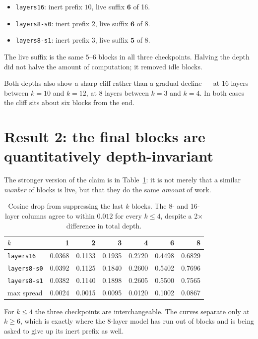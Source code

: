 \documentclass[11pt]{article}
\newcommand{\code}[1]{\texttt{\small #1}}
\begin{document}
\begin{itemize}
  \item \code{layers16}: inert prefix $10$, live suffix $\mathbf{6}$ of 16.
  \item \code{layers8-s0}: inert prefix $2$, live suffix $\mathbf{6}$ of 8.
  \item \code{layers8-s1}: inert prefix $3$, live suffix $\mathbf{5}$ of 8.
\end{itemize}

The live suffix is the same $5$--$6$ blocks in all three checkpoints. Halving
the depth did not halve the amount of computation; it removed idle blocks.

Both depths also show a sharp cliff rather than a gradual decline --- at 16
layers between $k=10$ and $k=12$, at 8 layers between $k=3$ and $k=4$. In both
cases the cliff sits about six blocks from the end.

\FloatBarrier
\section{Result 2: the final blocks are quantitatively depth-invariant}

The stronger version of the claim is in Table~\ref{tab:last}: it is not merely
that a similar \emph{number} of blocks is live, but that they do the same
\emph{amount} of work.

\begin{table}[htbp]
\centering
\caption{Cosine drop from suppressing the last $k$ blocks. The 8- and 16-layer
columns agree to within $0.012$ for every $k \le 4$, despite a 2$\times$
difference in total depth.}
\label{tab:last}
\small
\begin{tabular}{lrrrrrr}
\toprule
$k$ & 1 & 2 & 3 & 4 & 6 & 8 \\
\midrule
\code{layers16}   & 0.0368 & 0.1133 & 0.1935 & 0.2720 & 0.4498 & 0.6829 \\
\code{layers8-s0} & 0.0392 & 0.1125 & 0.1840 & 0.2600 & 0.5402 & 0.7696 \\
\code{layers8-s1} & 0.0382 & 0.1140 & 0.1898 & 0.2605 & 0.5500 & 0.7565 \\
\midrule
max spread        & 0.0024 & 0.0015 & 0.0095 & 0.0120 & 0.1002 & 0.0867 \\
\bottomrule
\end{tabular}
\end{table}

For $k \le 4$ the three checkpoints are interchangeable. The curves separate
only at $k \ge 6$, which is exactly where the 8-layer model has run out of
blocks and is being asked to give up its inert prefix as well.
\end{document}
